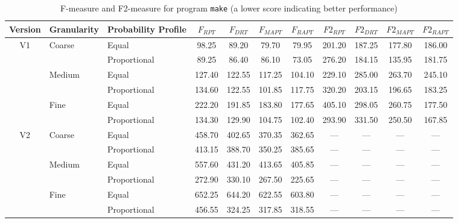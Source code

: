 \documentclass[10pt,journal,cspaper,compsoc,onecolumn]{IEEEtran}
\begin{document}
\begin{table}
\caption{F-measure and F2-measure for program \texttt{make} (a lower score indicating better performance)}
\label{tab:Fmake}
\centering
\begin{tabular}{|c|l|l|c|c|c|c|c|c|c|c|} \hline
Version	& Granularity	& Probability Profile	& $F_{RPT}$	& $F_{DRT}$	& $F_{MAPT}$	& $F_{RAPT}$	& $F2_{RPT}$	& $F2_{DRT}$	& $F2_{MAPT}$	 & $F2_{RAPT}$	\\ \hline
V1	& Coarse	& Equal	& 98.25	& 89.20	& 79.70	& 79.95	& 201.20	& 187.25	& 177.80	& 186.00	\\ \cline{3-11}
	& 	& Proportional	& 89.25	& 86.40	& 86.10	& 73.05	& 276.20	& 184.15	& 135.95	& 181.75	\\ \cline{2-11}
	& Medium	& Equal	& 127.40	& 122.55	& 117.25	& 104.10	& 229.10	& 285.00	& 263.70	& 245.10	\\ \cline{3-11}
	& 	& Proportional	& 134.60	& 122.55	& 101.85	& 117.75	& 320.20	& 203.15	& 196.65	& 183.25	\\ \cline{2-11}
	& Fine	& Equal	& 222.20	& 191.85	& 183.80	& 177.65	& 405.10	& 298.05	& 260.75	& 177.50	\\ \cline{3-11}
	& 	& Proportional	& 134.30	& 129.90	& 104.75	& 102.40	& 293.90	& 331.50	& 250.50	& 167.85	\\ \hline
V2	& Coarse	& Equal	& 458.70	& 402.65	& 370.35	& 362.65	& ---	& ---	& ---	& ---	\\ \cline{3-11}
	& 	& Proportional	& 413.15	& 388.70	& 350.25	& 385.65	& ---	& ---	& ---	& ---	\\ \cline{2-11}
	& Medium	& Equal	& 557.60	& 431.20	& 413.65	& 405.85	& ---	& ---	& ---	& ---	\\ \cline{3-11}
	& 	& Proportional	& 272.90	& 330.10	& 267.50	& 225.65	& ---	& ---	& ---	& ---	\\ \cline{2-11}
	& Fine	& Equal	& 652.25	& 644.20	& 622.55	& 603.80	& ---	& ---	& ---	& ---	\\ \cline{3-11}
	& 	& Proportional	& 456.55	& 324.25	& 317.85	& 318.55	& ---	& ---	& ---	& ---	\\ \hline
\end{tabular}
\end{table}
\end{document}
